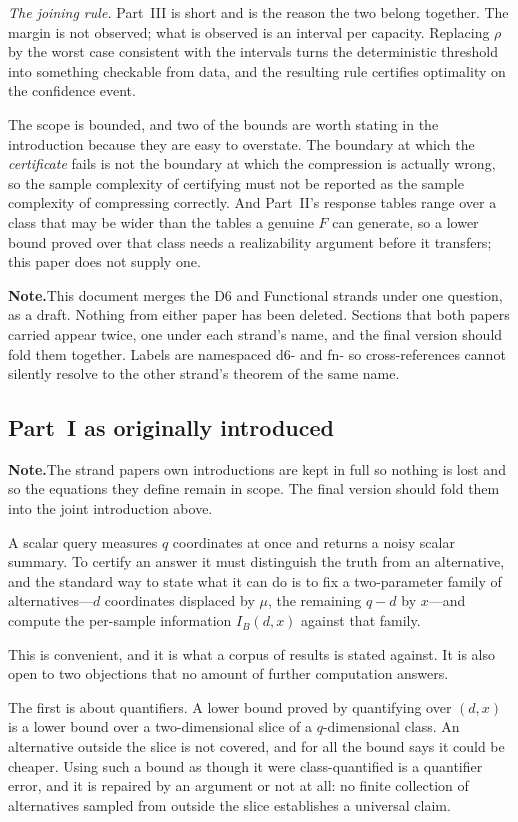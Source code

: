 \documentclass[conference]{IEEEtran}
\theoremstyle{definition}
\newif\ifshownotes\shownotestrue
\newcommand{\NOTEPAR}[1]{\ifshownotes\par\vspace{2pt}\noindent%
  {\color{notecol}\textsf{\footnotesize\textbf{Note.}\;#1}}\par\vspace{2pt}\fi}
\begin{document}
\emph{The joining rule.} Part~III is short and is the reason the two belong together. The
margin is not observed; what is observed is an interval per capacity. Replacing $\rho$ by the
worst case consistent with the intervals turns the deterministic threshold into something
checkable from data, and the resulting rule certifies optimality on the confidence event.

The scope is bounded, and two of the bounds are worth stating in the introduction because
they are easy to overstate. The boundary at which the \emph{certificate} fails is not the
boundary at which the compression is actually wrong, so the sample complexity of certifying
must not be reported as the sample complexity of compressing correctly. And Part~II's
response tables range over a class that may be wider than the tables a genuine $F$ can
generate, so a lower bound proved over that class needs a realizability argument before it
transfers; this paper does not supply one.

\NOTEPAR{This document merges the D6 and Functional strands under one question, as a draft.
Nothing from either paper has been deleted. Sections that both papers carried appear twice,
one under each strand's name, and the final version should fold them together. Labels are
namespaced \textsf{d6-} and \textsf{fn-} so cross-references cannot silently resolve to the
other strand's theorem of the same name.}

\subsection{Part~I as originally introduced}
\NOTEPAR{The strand papers own introductions are kept in full so nothing is lost and so the equations they define remain in scope. The final version should fold them into the joint introduction above.}


A scalar query measures $q$ coordinates at once and returns a noisy scalar summary. To
certify an answer it must distinguish the truth from an alternative, and the standard way to
state what it can do is to fix a two-parameter family of alternatives---$d$ coordinates
displaced by $\mu$, the remaining $q-d$ by $x$---and compute the per-sample information
$I_{B}(d,x)$ against that family.

This is convenient, and it is what a corpus of results is stated against. It is also open to
two objections that no amount of further computation answers.

The first is about quantifiers. A lower bound proved by quantifying over $(d,x)$ is a lower
bound over a two-dimensional slice of a $q$-dimensional class. An alternative outside the
slice is not covered, and for all the bound says it could be cheaper. Using such a bound as
though it were class-quantified is a quantifier error, and it is repaired by an argument or
not at all: no finite collection of alternatives sampled from outside the slice establishes a
universal claim.
\end{document}
